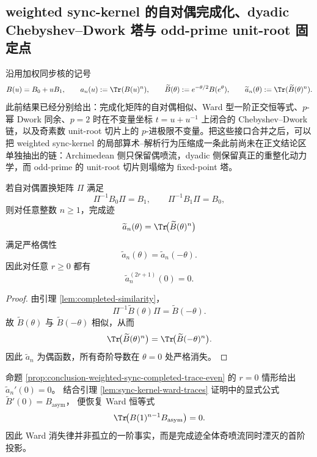 \subsection{weighted sync-kernel 的自对偶完成化、dyadic Chebyshev--Dwork 塔与 odd-prime unit-root 固定点}\label{subsec:conclusion-weighted-synckernel-selfdual-dyadic-unitroot-adelic-splitting}
沿用加权同步核的记号
\[
B(u)=B_0+uB_1,
\qquad
a_n(u):=\Tr(B(u)^n),
\qquad
\widetilde B(\theta):=e^{-\theta/2}B(e^\theta),
\qquad
\widetilde a_n(\theta):=\Tr(\widetilde B(\theta)^n).
\]
此前结果已经分别给出：完成化矩阵的自对偶相似、Ward 型一阶正交恒等式、\(p\)-幂 Dwork 同余、\(p=2\) 时在不变量坐标 \(t=u+u^{-1}\) 上闭合的 Chebyshev--Dwork 链，以及奇素数 unit-root 切片上的 \(p\)-进极限不变量。把这些接口合并之后，可以把 weighted sync-kernel 的局部算术--解析行为压缩成一条此前尚未在正文结论区单独抽出的链：Archimedean 侧只保留偶喷流，dyadic 侧保留真正的重整化动力学，而 odd-prime 的 unit-root 切片则塌缩为 fixed-point 塔。

\begin{proposition}[完成迹的偶性与自对偶信息压缩]\label{prop:conclusion-weighted-sync-completed-trace-even}
若自对偶置换矩阵 \(\Pi\) 满足
\[
\Pi^{-1}B_0\Pi=B_1,
\qquad
\Pi^{-1}B_1\Pi=B_0,
\]
则对任意整数 \(n\ge 1\)，完成迹
\[
\widetilde a_n(\theta)=\Tr\!\bigl(\widetilde B(\theta)^n\bigr)
\]
满足严格偶性
\[
\widetilde a_n(\theta)=\widetilde a_n(-\theta).
\]
因此对任意 \(r\ge 0\) 都有
\[
\widetilde a_n^{(2r+1)}(0)=0.
\]
\end{proposition}

\begin{proof}
由引理 \ref{lem:completed-similarity}，
\[
\Pi^{-1}\widetilde B(\theta)\Pi=\widetilde B(-\theta).
\]
故 \(\widetilde B(\theta)\) 与 \(\widetilde B(-\theta)\) 相似，从而
\[
\Tr\!\bigl(\widetilde B(\theta)^n\bigr)=\Tr\!\bigl(\widetilde B(-\theta)^n\bigr).
\]
因此 \(\widetilde a_n\) 为偶函数，所有奇阶导数在 \(\theta=0\) 处严格消失。
\end{proof}

\begin{remark}\label{rem:conclusion-weighted-sync-completed-trace-even-upgrades-ward}
命题 \ref{prop:conclusion-weighted-sync-completed-trace-even} 的 \(r=0\) 情形给出
\(
\widetilde a_n'(0)=0
\)。
结合引理 \ref{lem:sync-kernel-ward-traces} 证明中的显式公式
\(
\widetilde B'(0)=B_{\mathrm{asym}}
\)，
便恢复 Ward 恒等式
\[
\Tr\!\bigl(B(1)^{n-1}B_{\mathrm{asym}}\bigr)=0.
\]
因此 Ward 消失律并非孤立的一阶事实，而是完成迹全体奇喷流同时湮灭的首阶投影。
\end{remark}

